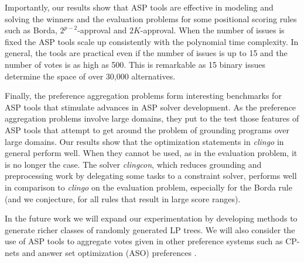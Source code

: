 Importantly, our results show that ASP tools are effective in modeling 
and solving the winners and the evaluation problems for some positional 
scoring rules such as Borda, $2^{p-2}$-approval and $2K$-approval. When 
the number of issues is fixed the ASP tools scale up consistently with 
the polynomial time complexity. In general, the tools are practical even 
if the number of issues is up to 15 and the number of votes is as high 
as 500. This is remarkable as 15 binary issues determine the space of over 
30,000 alternatives. 

Finally, the preference aggregation problems form 
interesting benchmarks for ASP tools that stimulate advances in ASP
solver development. As the preference aggregation problems involve large 
domains, they put to the test those features of ASP tools that attempt 
to get around the problem of grounding programs over large domains. Our 
results show that the optimization statements in \emph{clingo} in 
general perform well. When they cannot be used, as in the evaluation 
problem, it is no longer the case. The solver \emph{clingcon}, which 
reduces grounding and preprocessing work by delegating some tasks to a constraint solver, 
performs well in comparison to \emph{clingo} on the evaluation problem,
especially for the Borda rule (and we conjecture, for all rules that
result in large score ranges).

In the future work we will expand our experimentation by developing
methods to generate richer classes of randomly generated LP trees.
We will also consider the use of ASP tools to aggregate votes given in
other preference systems such as CP-nets \cite{bbdh03} and answer set 
optimization (ASO) preferences \cite{Brewka:ASO}.
